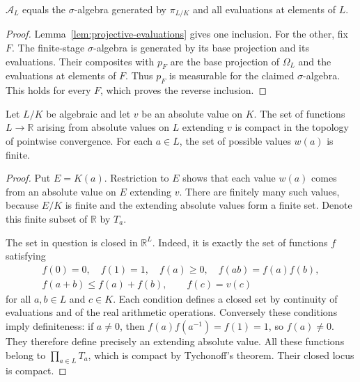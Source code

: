 \begin{proposition}\label{prop:projective-measurable-equality}
\leanok
{}
$\mathcal A_L$ equals the $\sigma$-algebra generated by $\pi_{L/K}$ and
all evaluations at elements of $L$.
\end{proposition}
\begin{proof}
Lemma~\ref{lem:projective-evaluations} gives one inclusion. For the other,
fix $F$. The finite-stage $\sigma$-algebra is generated by its base
projection and its evaluations. Their composites with $p_F$ are the
base projection of $\Omega_L$ and the evaluations at elements of $F$.
Thus $p_F$ is measurable for the claimed $\sigma$-algebra. This holds
for every $F$, which proves the reverse inclusion.
\end{proof}

\begin{lemma}
\label{lem:compact-absolute-value-extensions}
\leanok
{}
Let $L/K$ be algebraic and let $v$ be an absolute value on $K$.
The set of functions $L\to\mathbb R$ arising from absolute values
on $L$ extending $v$ is compact in the topology of pointwise convergence.
For each $a\in L$, the set of possible values $w(a)$ is finite.
\end{lemma}
\begin{proof}
Put $E=K(a)$. Restriction to $E$ shows that each value $w(a)$ comes
from an absolute value on $E$ extending $v$. There are finitely many
such values, because $E/K$ is finite and the extending absolute values
form a finite set. Denote this finite subset of $\mathbb R$ by $T_a$.

The set in question is closed in $\mathbb R^L$. Indeed, it is exactly
the set of functions $f$ satisfying
\[
 \begin{gathered}
 f(0)=0,\quad f(1)=1,\quad f(a)\geq0,\quad f(ab)=f(a)f(b),\\
 f(a+b)\leq f(a)+f(b),\qquad f(c)=v(c)
 \end{gathered}
\]
for all $a,b\in L$ and $c\in K$. Each condition defines a closed
set by continuity of evaluations and of the real arithmetic operations.
Conversely these conditions imply definiteness: if $a\ne0$, then
$f(a)f(a^{-1})=f(1)=1$, so $f(a)\ne0$.
They therefore define precisely an extending absolute value.
All these functions belong to $\prod_{a\in L}T_a$, which is compact
by Tychonoff's theorem. Their closed locus is compact.
\end{proof}

